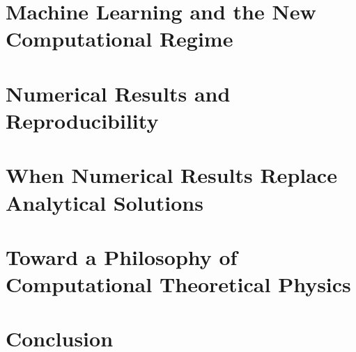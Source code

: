 \section{ Machine Learning and the New Computational Regime}
\label{nm:ml}
\section{ Numerical Results and Reproducibility}
\label{nm:res}
\section{ When Numerical Results Replace Analytical Solutions}
\label{nm:wnr}
\section{ Toward a Philosophy of Computational Theoretical Physics}
\label{nm:ctp}
\section{ Conclusion}
\label{nm:co}

